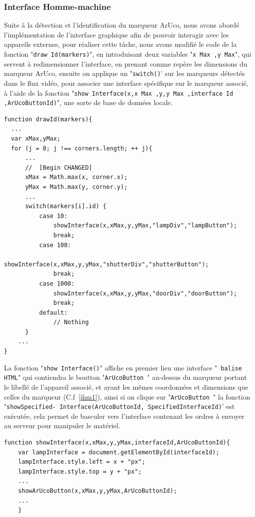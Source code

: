 \documentclass[12pt,a4paper]{article}
\begin{document}
\subsubsection{Interface Homme-machine}
	Suite à la détection et l'identification du marqueur ArUco, nous avons abordé  l'implémentation de l'interface graphique afin de pouvoir interagir avec les appareils externes, pour réaliser cette tâche, nous avons modifié le code de la fonction "\texttt{draw Id(markers)}", en introduisant deux variables "\texttt{x Max ,y Max}", qui servent à redimensionner l'interface, en prenant comme repère les dimensions du marqueur ArUco, ensuite on applique un "\texttt{switch()}' sur les marqueurs détectés dans le flux vidéo, pour associer une interface spécifique sur le marqueur associé,  à l'aide de la fonction "\texttt{show Interface(x,x Max ,y,y Max ,interface Id ,ArUcoButtonId)}", une sorte de base de données locale.
\begin{lstlisting}
function drawId(markers){
  ...
  var xMax,yMax;
  for (j = 0; j !== corners.length; ++ j){
      ...
      //  [Begin CHANGED]
      xMax = Math.max(x, corner.x);
      yMax = Math.max(y, corner.y);
      ...
      switch(markers[i].id) {
          case 10:
              showInterface(x,xMax,y,yMax,"lampDiv","lampButton");
              break;
          case 100:
              showInterface(x,xMax,y,yMax,"shutterDiv","shutterButton");
              break;
          case 1000:
              showInterface(x,xMax,y,yMax,"doorDiv","doorButton");
              break;
          default:
              // Nothing
      }
	...
}
\end{lstlisting}

La fonction "\texttt{show Interface()}" affiche en premier lieu une interface "\texttt{ balise HTML}" qui contiendra le boutton "\texttt{ArUcoButton }" au-dessus du marqueur portant le libellé de l'appareil associé, et ayant les mêmes coordonnées et dimensions que celles du marqueur (C.f~\ref{ihm1}), ainsi si on clique sur "\texttt{ArUcoButton }" la fonction "\texttt{showSpecified-
Interface(ArUcoButtonId, SpecifiedInterfaceId)}' est exécutée, cela permet de basculer vers l'interface contenant les ordres à envoyer au serveur pour manipuler le matériel.
\begin{lstlisting}
function showInterface(x,xMax,y,yMax,interfaceId,ArUcoButtonId){
	var lampInterface = document.getElementById(interfaceId);
	lampInterface.style.left = x + "px";
	lampInterface.style.top = y + "px";
	...
	showArUcoButton(x,xMax,y,yMax,ArUcoButtonId);
	...
    }
\end{lstlisting}
  
\end{document}
